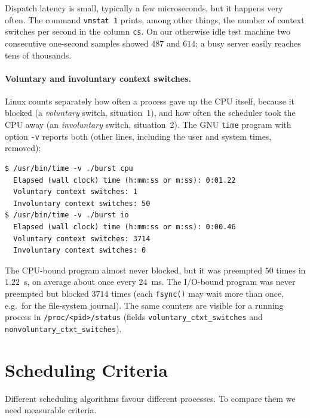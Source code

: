 \documentclass[11pt,a4paper]{article}
\newcommand{\cmd}[1]{\texttt{#1}}
\begin{document}
Dispatch latency is small, typically a few microseconds, but it happens very often. The command \cmd{vmstat 1} prints, among other things, the number of context switches per second in the column \texttt{cs}. On our otherwise idle test machine two consecutive one-second samples showed $487$ and $614$; a busy server easily reaches tens of thousands.

\paragraph{Voluntary and involuntary context switches.} Linux counts separately how often a process gave up the CPU itself, because it blocked (a \emph{voluntary} switch, situation~1), and how often the scheduler took the CPU away (an \emph{involuntary} switch, situation~2). The GNU \cmd{time} program with option \cmd{-v} reports both (other lines, including the user and system times, removed):

\begin{lstlisting}[style=term]
$ /usr/bin/time -v ./burst cpu
  Elapsed (wall clock) time (h:mm:ss or m:ss): 0:01.22
  Voluntary context switches: 1
  Involuntary context switches: 50
$ /usr/bin/time -v ./burst io
  Elapsed (wall clock) time (h:mm:ss or m:ss): 0:00.46
  Voluntary context switches: 3714
  Involuntary context switches: 0
\end{lstlisting}

The CPU-bound program almost never blocked, but it was preempted $50$ times in $1.22$~s, on average about once every $24$~ms. The I/O-bound program was never preempted but blocked $3714$ times (each \cmd{fsync()} may wait more than once, e.g.\ for the file-system journal). The same counters are visible for a running process in \cmd{/proc/<pid>/status} (fields \nolinkurl{voluntary_ctxt_switches} and \nolinkurl{nonvoluntary_ctxt_switches}).

\section{Scheduling Criteria}

Different scheduling algorithms favour different processes. To compare them we need measurable criteria.
\end{document}
